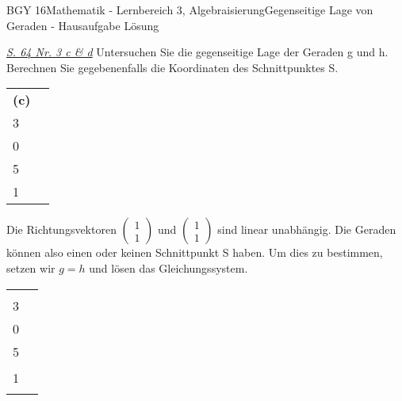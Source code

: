 \documentclass[oneside,openany,headings=optiontotoc,11pt,numbers=noenddot]{scrreprt}
\begin{document}
\begin{worksheet}{BGY 16}{Mathematik - Lernbereich 3, Algebraisierung}{Gegenseitige Lage von Geraden - Hausaufgabe Lösung}
		\begin{framed}
			\noindent
			\underline{\textit{S. 64 Nr. 3 c \& d}} Untersuchen Sie die gegenseitige Lage der Geraden g und h. Berechnen Sie gegebenenfalls die Koordinaten des Schnittpunktes S.\\
			\par\noindent
			\begin{tabularx}{\textwidth}{XX}
				\textbf{(c)} \(g: \vec{x} = \left(\begin{array}{c}7\\3\end{array}\right) + r\left(\begin{array}{c}1\\0\end{array}\right)\) & \(h: \vec{x} = \left(\begin{array}{c}2\\5\end{array}\right) + t\left(\begin{array}{c}1\\1\end{array}\right)\)
			\end{tabularx}
			Die Richtungsvektoren \(\left(\begin{array}{c}1\\1\end{array}\right)\) und \(\left(\begin{array}{c}1\\1\end{array}\right)\) sind \color{blue}linear unabhängig\normalcolor. Die Geraden können also \color{red}einen\normalcolor{} oder \color{codegreen}keinen\normalcolor{} Schnittpunkt S haben. Um dies zu bestimmen, setzen wir \(g=h\) und lösen das Gleichungssystem.\\
			\par\noindent
			\begin{tabularx}{\textwidth}{X|X}
				\(\left(\begin{array}{c}7\\3\end{array}\right) + r\left(\begin{array}{c}1\\0\end{array}\right) = \left(\begin{array}{c}2\\5\end{array}\right) + t\left(\begin{array}{c}1\\1\end{array}\right)\) & \begin{tabular}{lll}

\end{tabular}
\end{tabularx}
\end{framed}
\end{worksheet}
\end{document}

